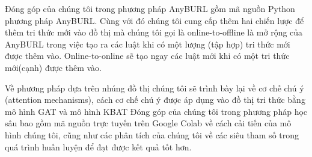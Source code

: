 Đóng góp của chúng tôi trong phương pháp AnyBURL\cite{burl} gồm mã nguồn Python phương pháp AnyBURL. Cùng với đó chúng tôi cung cấp thêm hai chiến lược để thêm tri thức mới vào đồ thị mà chúng tôi gọi là online-to-offline là mở rộng của AnyBURL trong việc tạo ra các luật khi có một lượng (tập hợp) tri thức mới được thêm vào. Online-to-online sẽ tạo ngay các luật mới khi có một tri thức mới(cạnh) được thêm vào.

Về phương pháp dựa trên nhúng đồ thị chúng tôi sẽ trình bày lại về cơ chế chú ý (attention mechanisms), cách cơ chế chú ý được áp dụng vào đồ thị tri thức bằng mô hình GAT và mô hình KBAT %
Đóng góp của chúng tôi trong phương pháp học sâu bao gồm mã nguồn trực tuyến trên Google Colab về cách cải tiến của mô hình chúng tôi, cũng như các phân tích của chúng tôi về các siêu tham số trong quá trình huấn luyện để đạt được kết quả tốt hơn.







